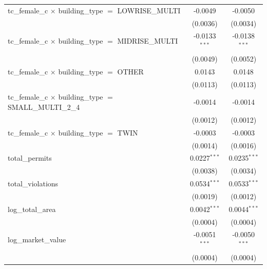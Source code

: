 \begin{tabular}{lcc}
   tc\_female\_c $\times$ building\_type $=$ LOWRISE\_MULTI            & -0.0049         & -0.0050\\   
                                                                       & (0.0036)        & (0.0034)\\   
   tc\_female\_c $\times$ building\_type $=$ MIDRISE\_MULTI            & -0.0133$^{***}$ & -0.0138$^{***}$\\   
                                                                       & (0.0049)        & (0.0052)\\   
   tc\_female\_c $\times$ building\_type $=$ OTHER                     & 0.0143          & 0.0148\\   
                                                                       & (0.0113)        & (0.0113)\\   
   tc\_female\_c $\times$ building\_type $=$ SMALL\_MULTI\_2\_4        & -0.0014         & -0.0014\\   
                                                                       & (0.0012)        & (0.0012)\\   
   tc\_female\_c $\times$ building\_type $=$ TWIN                      & -0.0003         & -0.0003\\   
                                                                       & (0.0014)        & (0.0016)\\   
   total\_permits                                                      & 0.0227$^{***}$  & 0.0235$^{***}$\\   
                                                                       & (0.0038)        & (0.0034)\\   
   total\_violations                                                   & 0.0534$^{***}$  & 0.0533$^{***}$\\   
                                                                       & (0.0019)        & (0.0012)\\   
   log\_total\_area                                                    & 0.0042$^{***}$  & 0.0044$^{***}$\\   
                                                                       & (0.0004)        & (0.0004)\\   
   log\_market\_value                                                  & -0.0051$^{***}$ & -0.0050$^{***}$\\   
                                                                       & (0.0004)        & (0.0004)\\   

\end{tabular}
